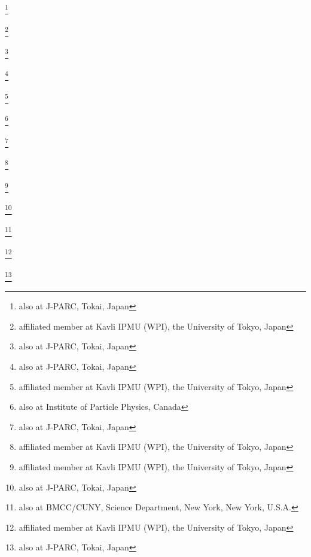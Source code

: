 \author{Y.\,Seiya}\INSTCF
\author{T.\,Sekiguchi}\thanks{also at J-PARC, Tokai, Japan}\INSTCB
\author{H.\,Sekiya}\thanks{affiliated member at Kavli IPMU (WPI), the University of Tokyo, Japan}\INSTBJ\INSTHA
\author{D.\,Sgalaberna}\INSTEG
\author{R.\,Shah}\INSTEH\INSTGG
\author{A.\,Shaikhiev}\INSTEB
\author{F.\,Shaker}\INSTGH
\author{D.\,Shaw}\INSTEJ
\author{M.\,Shiozawa}\INSTBJ\INSTHA
\author{T.\,Shirahige}\INSTGJ
\author{M.\,Smy}\INSTGA
\author{J.T.\,Sobczyk}\INSTEA
\author{H.\,Sobel}\INSTGA\INSTHA
\author{J.\,Steinmann}\INSTBC
\author{T.\,Stewart}\INSTEH
\author{P.\,Stowell}\INSTFB
\author{Y.\,Suda}\INSTCH
\author{S.\,Suvorov}\INSTEB
\author{A.\,Suzuki}\INSTCC
\author{S.Y.\,Suzuki}\thanks{also at J-PARC, Tokai, Japan}\INSTCB
\author{Y.\,Suzuki}\INSTHA
\author{R.\,Tacik}\INSTE\INSTB
\author{M.\,Tada}\thanks{also at J-PARC, Tokai, Japan}\INSTCB
\author{A.\,Takeda}\INSTBJ
\author{Y.\,Takeuchi}\INSTCC\INSTHA
\author{R.\,Tamura}\INSTCH
\author{H.K.\,Tanaka}\thanks{affiliated member at Kavli IPMU (WPI), the University of Tokyo, Japan}\INSTBJ
\author{H.A.\,Tanaka}\thanks{also at Institute of Particle Physics, Canada}\INSTF\INSTB
\author{T.\,Thakore}\INSTFI
\author{L.F.\,Thompson}\INSTFB
\author{S.\,Tobayama}\INSTD\INSTB
\author{W.\,Toki}\INSTFG
\author{T.\,Tomura}\INSTBJ
\author{T.\,Tsukamoto}\thanks{also at J-PARC, Tokai, Japan}\INSTCB
\author{M.\,Tzanov}\INSTFI
\author{M.\,Vagins}\INSTHA\INSTGA
\author{Z.\,Vallari}\INSTFJ
\author{G.\,Vasseur}\INSTI
\author{C.\,Vilela}\INSTFJ
\author{T.\,Vladisavljevic}\INSTGG\INSTHA
\author{T.\,Wachala}\INSTDG
\author{C.W.\,Walter}\thanks{affiliated member at Kavli IPMU (WPI), the University of Tokyo, Japan}\INSTFH
\author{D.\,Wark}\INSTEH\INSTGG
\author{M.O.\,Wascko}\INSTEI
\author{A.\,Weber}\INSTEH\INSTGG
\author{R.\,Wendell}\thanks{affiliated member at Kavli IPMU (WPI), the University of Tokyo, Japan}\INSTCD
\author{M.J.\,Wilking}\INSTFJ
\author{C.\,Wilkinson}\INSTEE
\author{J.R.\,Wilson}\INSTFA
\author{R.J.\,Wilson}\INSTFG
\author{C.\,Wret}\INSTEI
\author{Y.\,Yamada}\thanks{also at J-PARC, Tokai, Japan}\INSTCB
\author{K.\,Yamamoto}\INSTCF
\author{C.\,Yanagisawa}\thanks{also at BMCC/CUNY, Science Department, New York, New York, U.S.A.}\INSTFJ
\author{T.\,Yano}\INSTCC
\author{S.\,Yen}\INSTB
\author{N.\,Yershov}\INSTEB
\author{M.\,Yokoyama}\thanks{affiliated member at Kavli IPMU (WPI), the University of Tokyo, Japan}\INSTCH
\author{M.\,Yu}\INSTH
\author{A.\,Zalewska}\INSTDG
\author{J.\,Zalipska}\INSTDF
\author{L.\,Zambelli}\thanks{also at J-PARC, Tokai, Japan}\INSTCB
\author{K.\,Zaremba}\INSTDH
\author{M.\,Ziembicki}\INSTDH
\author{E.D.\,Zimmerman}\INSTGB
\author{M.\,Zito}\INSTI

\noaffiliation